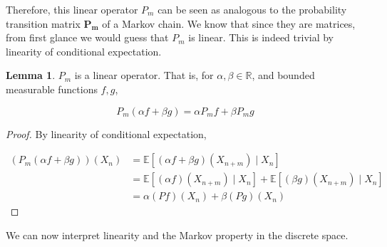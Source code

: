 \documentclass{article}
\theoremstyle{definition}
\newtheorem{lemma}[theorem]{Lemma}
\theoremstyle{remark}
\theoremstyle{definition}
\begin{document}
  Therefore, this linear operator $P_m$ can be seen as analogous to the probability transition matrix $\mathbf{P_m}$ of a Markov chain. We know that since they are matrices, from first glance we would guess that $P_m$ is linear. This is indeed trivial by linearity of conditional expectation. 

  \begin{lemma}
    $P_m$ is a linear operator. That is, for $\alpha, \beta \in \mathbb{R}$, and bounded measurable functions $f, g$, 

      \[P_m (\alpha f + \beta g) = \alpha P_m f + \beta P_m g\] 
  \end{lemma}
  \begin{proof}
    By linearity of conditional expectation, 

    \begin{align*}
      (P_m (\alpha f + \beta g))(X_n) & = \mathbb{E}[(\alpha f + \beta g)(X_{n+m}) \mid X_n] \\
      & = \mathbb{E}[(\alpha f) (X_{n + m}) \mid X_n] + \mathbb{E}[(\beta g) (X_{n+m}) \mid X_n] \\
      & = \alpha (P f) (X_n) + \beta (P g) (X_n)
    \end{align*}
  \end{proof}

  We can now interpret linearity and the Markov property in the discrete space. 
\end{document}
